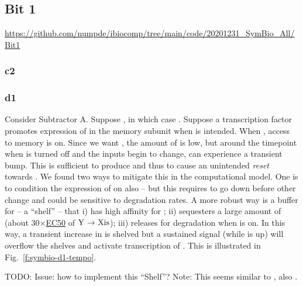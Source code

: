 \documentclass[12pt,notitlepage]{article}
\newcommand{\TODO}[1]{\textrm{\color{red}TODO: #1}}
\newcommand{\act}{\ {\ensuremath{\mathbin{\to}}}\ }
\newcommand{\ra}[1]{{\color{Blue}#1}}
\begin{document}
\subsection{Bit 1} \label{s:sim:bit1}

\url{https://github.com/numpde/ibiocomp/tree/main/code/20201231_SymBio_All/Bit1}


\subsubsection*{c2} \label{s:sim:bit1:c2}



\subsubsection*{d1} \label{s:sim:bit1:d1}

Consider Subtractor A.
%
Suppose ,
in which case .
%
Suppose a transcription factor 
promotes expression of  in the memory subunit
when  is intended.
%
%
When ,
access to memory is on.
%
Since we want ,
the amount of  is low,
but
around the timepoint when 
 is turned off
and the inputs begin to change,
 can experience a transient bump.
%
This is sufficient to produce 
and thus to cause an unintended \emph{reset}
towards .
%
We found two ways to mitigate this
in the computational model.
%
One is to condition the expression of 
on  also
--
but this requires  to go down
before other change
and could be sensitive to degradation rates.
%
A more robust way
is a buffer for 
-- a ``shelf'' --
that 
%
i)
has high affinity for ;
%
ii)
sequesters 
a large amount of 
(about 30$\times$\href{https://en.wikipedia.org/wiki/EC50}{EC50} of $\ce{Y} \act \ce{Xis}$);
%
iii)
releases  for degradation when  is on.
%
In this way, 
a transient increase in  is shelved
but a sustained signal 
(while  is up)
will overflow the shelves and activate 
transcription of .
%
%
This is illustrated in Fig.~\ref{f:symbio-d1-tempo}.

\TODO{\ra{Issue: how to implement this ``Shelf''?}}
\ra{%
Note: This seems similar to
\cite[\href{{https://www.pnas.org/content/pnas/104/8/2643/F1.large.jpg?width=800&height=600&carousel=1}}{Fig.~1}]{WeberETAL2007},
also
\cite{NilgiriwalaETAL2014}.
}

%
\end{document}
